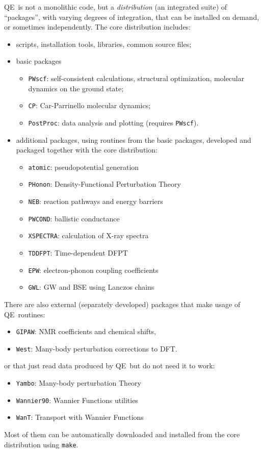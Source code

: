 \documentclass[12pt,a4paper]{article}
\def\qe{QE}
\begin{document}
\qe\ is not a monolithic code, but a {\em distribution}
(an integrated suite) of ``packages'', with
varying degrees of integration, that can be installed on demand,
or sometimes independently. The core distribution includes:
\begin{itemize}
\item scripts, installation tools, libraries, common source files;
\item basic packages
\begin{itemize}
\item \texttt{PWscf}: self-consistent calculations, structural optimization,
molecular dynamics on the ground state;
\item \texttt{CP}: Car-Parrinello molecular dynamics;
\item \texttt{PostProc}: data analysis and plotting (requires \texttt{PWscf}).
\end{itemize}
\item additional packages, using routines from the basic packages,
      developed and packaged together with the core distribution: 
\begin{itemize}
\item \texttt{atomic}: pseudopotential generation
\item \texttt{PHonon}: Density-Functional Perturbation Theory
\item \texttt{NEB}: reaction pathways and energy barriers
\item \texttt{PWCOND}: ballistic conductance
\item \texttt{XSPECTRA}: calculation of X-ray spectra
\item \texttt{TDDFPT}: Time-dependent DFPT
\item \texttt{EPW}: electron-phonon coupling coefficients
\item \texttt{GWL}: GW and BSE using Lanczos chains
\end{itemize}
\end{itemize}
There are also external (separately developed) packages that make usage 
of \qe\ routines:
\begin{itemize}
\item \texttt{GIPAW}: NMR coefficients and chemical shifts, 
\item \texttt{West}: Many-body perturbation corrections to DFT.
\end{itemize}
or that just read data produced by \qe\ but do not need it to work:
\begin{itemize}
\item \texttt{Yambo}: Many-body perturbation Theory
\item \texttt{Wannier90}: Wannier Functions utilities
\item \texttt{WanT}: Transport with Wannier Functions
\end{itemize}
Most of them can be automatically downloaded and installed from the core
distribution using \texttt{make}.
\end{document}
